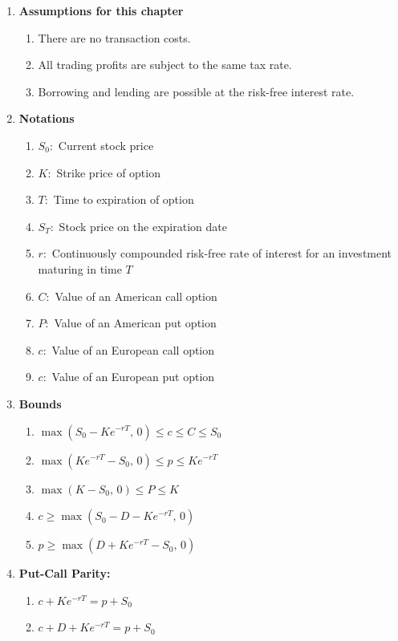 \begin{enumerate}
\begin{table}[h]
\begin{minipage}{\linewidth}
        $+$ indicates that an increase in the variable causes the option price to increase or stay the same;\\
        $-$ indicates that an increase in the variable causes the option price to decrease or stay the same;\\
        ? indicates that the relationship is uncertain.
        
        \end{minipage}
        \end{table}

    \item \textbf{Assumptions for this chapter}
    \begin{enumerate}
        \item There are no transaction costs.
        \item All trading profits are subject to the same tax rate.
        \item Borrowing and lending are possible at the risk-free interest rate.
    \end{enumerate}
    \item \textbf{Notations}
    \begin{enumerate}
        \item $S_0:$ Current stock price
        \item $K:$ Strike price of option
        \item $T:$ Time to expiration of option
        \item $S_T:$ Stock price on the expiration date
        \item $r:$ Continuously compounded risk-free rate of interest for an investment maturing in time $T$
        \item $C:$ Value of an American call option
        \item $P:$ Value of an American put option
        \item $c:$ Value of an European call option
        \item $c:$ Value of an European put option
    \end{enumerate}
    \item \textbf{Bounds}
    \begin{enumerate}
        \item $\max(S_0 - Ke^{-rT},\,0) \leq c \leq C \leq S_0$
        \item $\max(Ke^{-rT} - S_0,\,0) \leq p \leq Ke^{-rT}$
        \item $\max(K - S_0,\,0) \leq P \leq K $
        \item $c \geq \max(S_0 - D - Ke^{-rT},\,0) $
        \item $p \geq \max(D + Ke^{-rT} - S_0,\,0)$
    \end{enumerate}
    \item \textbf{Put-Call Parity:}
    \begin{enumerate}
    \item $c + Ke^{-rT} = p + S_0$ 
    \item $c + D + Ke^{-rT} = p + S_0$
    \end{enumerate}

\end{enumerate}